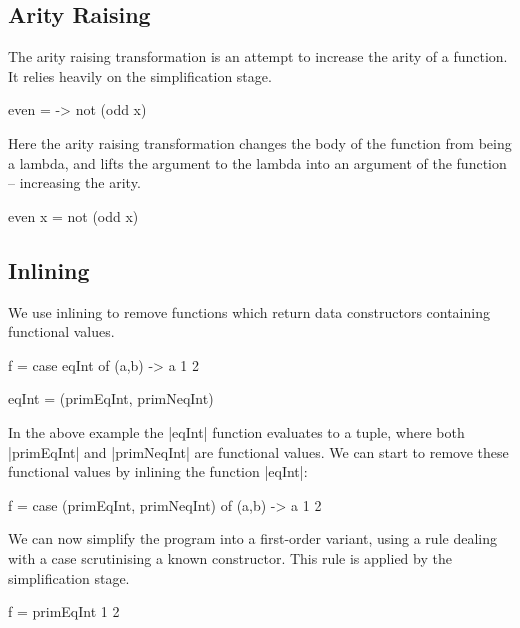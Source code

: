 \documentclass[preprint]{sigplanconf}
\begin{document}
\subsection{Arity Raising}

The arity raising transformation is an attempt to increase the arity of a function. It relies heavily on the simplification stage.

\begin{example}
\begin{code}
even = \x -> not (odd x)
\end{code}

Here the arity raising transformation changes the body of the function from being a lambda, and lifts the argument to the lambda into an argument of the function -- increasing the arity.

\begin{code}
even x = not (odd x)
\end{code}
\end{example}


\subsection{Inlining}

We use inlining to remove functions which return data constructors containing functional values.

\begin{example}
\begin{code}
f = case  eqInt of
          (a,b) -> a 1 2

eqInt = (primEqInt, primNeqInt)
\end{code}

In the above example the |eqInt| function evaluates to a tuple, where both |primEqInt| and |primNeqInt| are functional values. We can start to remove these functional values by inlining the function |eqInt|:

\begin{code}
f = case  (primEqInt, primNeqInt) of
          (a,b) -> a 1 2
\end{code}

We can now simplify the program into a first-order variant, using a rule dealing with a case scrutinising a known constructor. This rule is applied by the simplification stage.

\begin{code}
f = primEqInt 1 2
\end{code}
\end{example}
\end{document}
